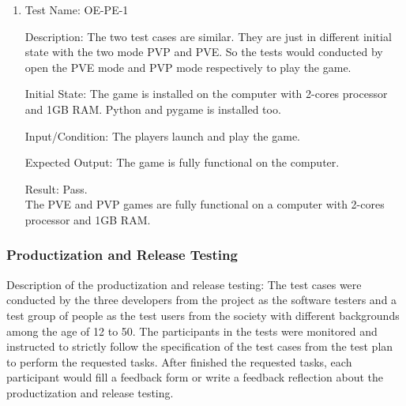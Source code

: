 \documentclass[12pt, titlepage]{article}
\begin{document}
\begin{enumerate}

\item{Test Name: OE-PE-1\\}

Description:  The two test cases are similar. They are just in different initial state with the two mode PVP and PVE. So the tests would conducted by open the PVE mode and PVP mode respectively to play the game.

Initial State: The game is installed on the computer with 2-cores processor and 1GB RAM. Python and pygame is installed too.

Input/Condition: The players launch and play the game.

Expected Output: The game is fully functional on the computer.

Result: Pass. \\The PVE and PVP games are fully functional on a computer with 2-cores processor and 1GB RAM. 

\end{enumerate}

\subsubsection{Productization and Release Testing}
Description of the productization and release testing: The test cases were conducted by the three developers from the project as the software testers and a test group of people as the test users from the society with different backgrounds among the age of 12 to 50. The participants in the tests were monitored and instructed to strictly follow the specification of the test cases from the test plan to perform the requested tasks. After finished the requested tasks, each participant would fill a feedback form or write a feedback reflection about the productization and release testing.
\end{document}
